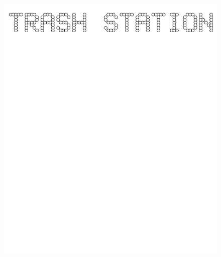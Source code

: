 \documentclass[17pt]{extreport}
\begin{document}
	
	\begin{figure}
		\centering
		\includegraphics[width=6.25in]{imageserver/uploadimages/trashstation.png}
	\end{figure}
	
\end{document}
